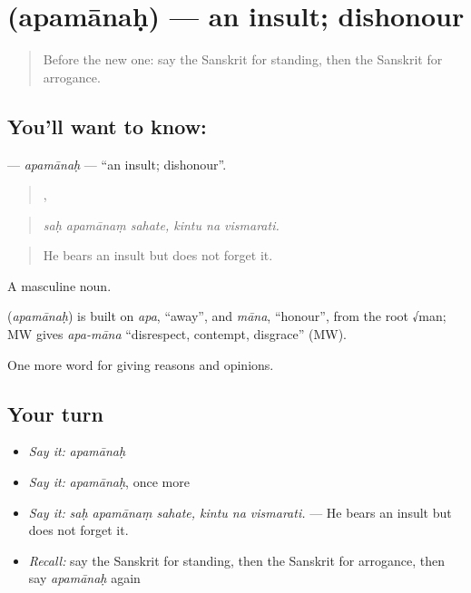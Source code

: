 \section[\texorpdfstring{\sk{अपमानः} (apamānaḥ)}{अपमानः (apamānaḥ)}]{ (apamānaḥ) — an insult; dishonour}

\label{lesson:SA-C360-apamanah}



\begin{quote}
Before the new one: say the Sanskrit for standing, then the Sanskrit for arrogance.
\end{quote}

\subsection*{You'll want to know: }
\textbf{} — \emph{apamānaḥ} — \textquotedblleft{}an insult; dishonour\textquotedblright{}.

\begin{quote}
  ,   
\end{quote}

\begin{quote}
\emph{saḥ apamānaṃ sahate, kintu na vismarati.}
\end{quote}

\begin{quote}
He bears an insult but does not forget it.
\end{quote}

A masculine noun.

\begin{cousinweb}
\textbf{} (\emph{apamānaḥ}) is built on \emph{apa}, \textquotedblleft{}away\textquotedblright{}, and \emph{māna}, \textquotedblleft{}honour\textquotedblright{}, from the root √man; MW gives \emph{apa-māna} \textquotedblleft{}disrespect, contempt, disgrace\textquotedblright{} (MW).
\end{cousinweb}

\begin{grammarlens}[title={What you've built}]
One more word for giving reasons and opinions.
\end{grammarlens}

\subsection*{Your turn}
\begin{itemize}
\raggedright
  \item \emph{Say it:} \emph{apamānaḥ}
  \item \emph{Say it:} \emph{apamānaḥ}, once more
  \item \emph{Say it:} \emph{saḥ apamānaṃ sahate, kintu na vismarati.} — He bears an insult but does not forget it.
  \item \emph{Recall:} say the Sanskrit for standing, then the Sanskrit for arrogance, then say \emph{apamānaḥ} again
\end{itemize}

